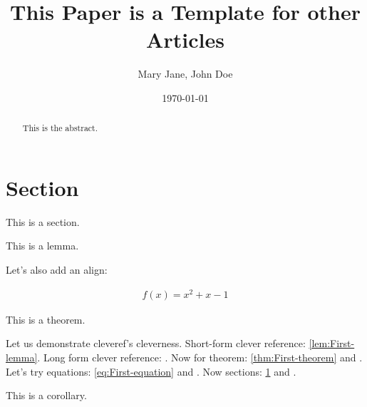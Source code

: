 \documentclass{article}
\begin{document}
\title{This Paper is a Template for other Articles}

\author{Mary Jane, John Doe}

\date{\today}

\maketitle

\begin{abstract}
This is the abstract.
\end{abstract}

\section{Section}\label{sec:First-section}
This is a section.

\begin{lem}\label{lem:First-lemma}
This is a lemma.

\end{lem}

Let's also add an align:

%
\begin{align}\label{eq:First-equation}
f(x) = x^2+x-1
\end{align}


\begin{thm}\label{thm:First-theorem}
This is a theorem.

\end{thm}

Let us demonstrate cleveref's cleverness. Short-form clever reference: \cref{lem:First-lemma}. Long form clever reference: . Now for theorem: \cref{thm:First-theorem} and . Let's try equations: \cref{eq:First-equation} and . Now sections: \cref{sec:First-section} and .

\begin{cor}\label{cor:First-corollary}
This is a corollary.

\end{cor}
\end{document}
